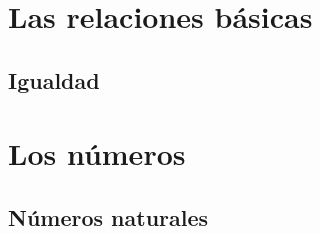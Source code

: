 



\section{Las relaciones básicas}
\subsection{Igualdad}




\section{Los números}
\subsection{Números naturales}



